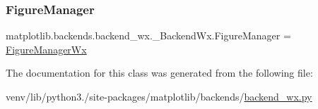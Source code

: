 \subsubsection{\texorpdfstring{Figure\+Manager}{FigureManager}}
{\footnotesize\ttfamily matplotlib.\+backends.\+backend\+\_\+wx.\+\_\+\+Backend\+Wx.\+Figure\+Manager = \hyperlink{classmatplotlib_1_1backends_1_1backend__wx_1_1FigureManagerWx}{Figure\+Manager\+Wx}\hspace{0.3cm}{\ttfamily [static]}}



The documentation for this class was generated from the following file\+:\begin{DoxyCompactItemize}
\item 
venv/lib/python3./site-\/packages/matplotlib/backends/\hyperlink{backend__wx_8py}{backend\+\_\+wx.\+py}\end{DoxyCompactItemize}
